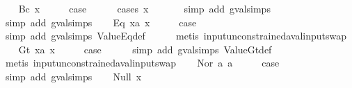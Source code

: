\begin{isabellebody}
\ \ \isamarkupfalse%
\ {\isacharparenleft}Bc\ x{\isacharparenright}\isanewline
\ \ \isamarkupfalse%
\ \isamarkupfalse%
\ {\isacharquery}case\isanewline
\ \ \ \ \isamarkupfalse%
\ {\isacharparenleft}cases\ x{\isacharparenright}\isanewline
\ \ \ \ \ \isamarkupfalse%
\ {\isacharparenleft}simp\ add{\isacharcolon}\ gval{\isachardot}simps{\isacharparenleft}{}{\isacharparenright}{\isacharparenright}\isanewline
\ \ \ \ \isamarkupfalse%
\ {\isacharparenleft}simp\ add{\isacharcolon}\ gval{\isachardot}simps{\isacharparenleft}{}{\isacharparenright}{\isacharparenright}\isanewline
{}\isamarkupfalse%
\isanewline
\ \ \isamarkupfalse%
\ {\isacharparenleft}Eq\ x{}a\ x{}{\isacharparenright}\isanewline
\ \ \isamarkupfalse%
\ \isamarkupfalse%
\ {\isacharquery}case\isanewline
\ \ \ \ \isamarkupfalse%
\ {\isacharparenleft}simp\ add{\isacharcolon}\ gval{\isachardot}simps\ ValueEq{\isacharunderscore}def{\isacharparenright}\isanewline
\ \ \ \ \isamarkupfalse%
\ {\isacharparenleft}metis\ input{\isacharunderscore}unconstrained{\isacharunderscore}aval{\isacharunderscore}input{\isacharunderscore}swap{\isacharparenright}\isanewline
{}\isamarkupfalse%
\isanewline
\ \ \isamarkupfalse%
\ {\isacharparenleft}Gt\ x{}a\ x{}{\isacharparenright}\isanewline
\ \ \isamarkupfalse%
\ \isamarkupfalse%
\ {\isacharquery}case\isanewline
\ \ \ \ \isamarkupfalse%
\ {\isacharparenleft}simp\ add{\isacharcolon}\ gval{\isachardot}simps\ ValueGt{\isacharunderscore}def{\isacharparenright}\isanewline
\ \ \ \ \isamarkupfalse%
\ {\isacharparenleft}metis\ input{\isacharunderscore}unconstrained{\isacharunderscore}aval{\isacharunderscore}input{\isacharunderscore}swap{\isacharparenright}\isanewline
{}\isamarkupfalse%
\isanewline
\ \ \isamarkupfalse%
\ {\isacharparenleft}Nor\ a{}\ a{}{\isacharparenright}\isanewline
\ \ \isamarkupfalse%
\ \isamarkupfalse%
\ {\isacharquery}case\isanewline
\ \ \ \ \isamarkupfalse%
\ {\isacharparenleft}simp\ add{\isacharcolon}\ gval{\isachardot}simps{\isacharparenleft}{}{\isacharparenright}{\isacharparenright}\isanewline
{}\isamarkupfalse%
\isanewline
\ \ \isamarkupfalse%
\ {\isacharparenleft}Null\ x{\isacharparenright}\isanewline

\end{isabellebody}
